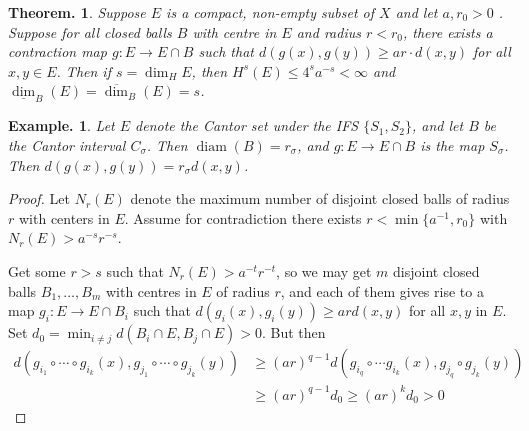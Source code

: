 \documentclass[11pt, a4paper]{memoir}
\theoremstyle{change}
\newtheorem{theorem}{Theorem.}[section]
\theoremstyle{plain}
\theoremstyle{nonumberplain}
\newtheorem{example}{Example.}
\newtheorem{proof}{Proof}
\DeclareMathOperator{\diam}{diam}
\numberwithin{equation}{section}
\begin{document}
\begin{theorem}
    Suppose $E$ is a compact, non-empty subset of $X$ and let $a,r_0>0$ .
    Suppose for all closed balls $B$ with centre in $E$ and radius $r<r_0$, there exists a contraction map $g:E\to E\cap B$ such that $d(g(x),g(y))\geq ar\cdot d(x,y)$ for all $x,y\in E$.
    Then if $s=\dim_HE$, then $H^s(E)\leq 4^sa^{-s}<\infty$ and $\underline{\dim}_B(E)=\overline{\dim}_B(E)=s$.
\end{theorem}
\begin{example}
    Let $E$ denote the Cantor set under the IFS $\{S_1,S_2\}$, and let $B$ be the Cantor interval $C_\sigma$.
    Then $\diam(B)=r_\sigma$, and $g:E\to E\cap B$ is the map $S_\sigma$.
    Then $d(g(x),g(y))=r_\sigma d(x,y)$.
\end{example}
\begin{proof}
    Let $N_r(E)$ denote the maximum number of disjoint closed balls of radius $r$ with centers in $E$.
    Assume for contradiction there exists $r<\min\{a^{-1},r_0\}$ with $N_r(E)>a^{-s}r^{-s}$.

    Get some $r>s$ such that $N_r(E)>a^{-t}r^{-t}$, so we may get $m$ disjoint closed balls $B_1,\ldots, B_m$ with centres in $E$ of radius $r$, and each of them gives rise to a map $g_i:E\to E\cap B_i$ such that $d(g_i(x),g_i(y))\geq ard(x,y)$ for all $x,y$ in $E$.
    Set $d_0=\min_{i\neq j}d(B_i\cap E,B_j\cap E)>0$.
    But then
    \begin{align*}
        d(g_{i_1}\circ\cdots\circ g_{i_k}(x),g_{j_1}\circ\cdots\circ g_{j_k}(y)) &\geq (ar)^{q-1} d(g_{i_q}\circ\cdots g_{i_k}(x),g_{j_q}\circ g_{j_k}(y))\\
                                                                                 &\geq (ar)^{q-1}d_0\geq(ar)^kd_0>0
    \end{align*}
\end{proof}
\end{document}
